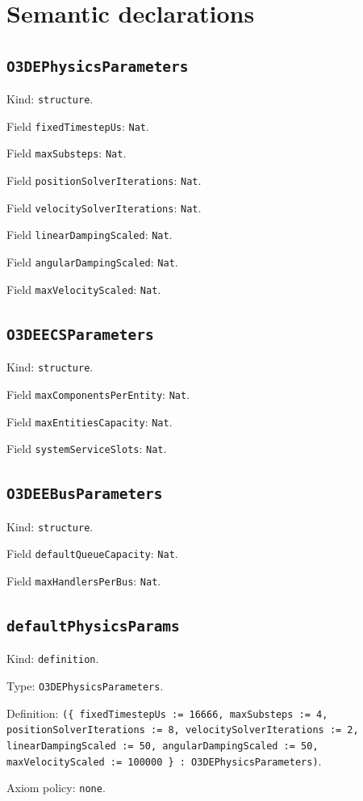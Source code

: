 \documentclass[11pt]{article}
\begin{document}
\section*{Semantic declarations}
\subsection*{\texttt{O3DEPhysicsParameters}}
\noindent Kind: \texttt{structure}.\par
\noindent Field \texttt{fixedTimestepUs}: \texttt{Nat}.\par
\noindent Field \texttt{maxSubsteps}: \texttt{Nat}.\par
\noindent Field \texttt{positionSolverIterations}: \texttt{Nat}.\par
\noindent Field \texttt{velocitySolverIterations}: \texttt{Nat}.\par
\noindent Field \texttt{linearDampingScaled}: \texttt{Nat}.\par
\noindent Field \texttt{angularDampingScaled}: \texttt{Nat}.\par
\noindent Field \texttt{maxVelocityScaled}: \texttt{Nat}.\par
\subsection*{\texttt{O3DEECSParameters}}
\noindent Kind: \texttt{structure}.\par
\noindent Field \texttt{maxComponentsPerEntity}: \texttt{Nat}.\par
\noindent Field \texttt{maxEntitiesCapacity}: \texttt{Nat}.\par
\noindent Field \texttt{systemServiceSlots}: \texttt{Nat}.\par
\subsection*{\texttt{O3DEEBusParameters}}
\noindent Kind: \texttt{structure}.\par
\noindent Field \texttt{defaultQueueCapacity}: \texttt{Nat}.\par
\noindent Field \texttt{maxHandlersPerBus}: \texttt{Nat}.\par
\subsection*{\texttt{defaultPhysicsParams}}
\noindent Kind: \texttt{definition}.\par
\noindent Type: \texttt{O3DEPhysicsParameters}.\par
\noindent Definition: \texttt{(\{ fixedTimestepUs := 16666, maxSubsteps := 4, positionSolverIterations := 8, velocitySolverIterations := 2, linearDampingScaled := 50, angularDampingScaled := 50, maxVelocityScaled := 100000 \} : O3DEPhysicsParameters)}.\par
\noindent Axiom policy: \texttt{none}.\par
\end{document}
